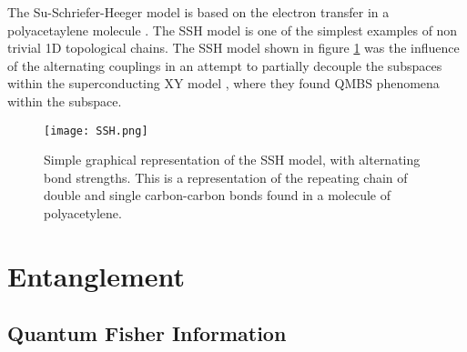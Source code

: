 The Su-Schriefer-Heeger model is based on the electron transfer in a polyacetaylene molecule \citep{su_solitons_1979}. The SSH model is one of the simplest examples of non trivial 1D topological chains. The SSH model shown in figure  \ref{fig:fig_SSH} was the influence of the alternating couplings in an attempt to partially decouple the subspaces within the superconducting XY model \citep{zhang_many-body_2022}, where they found QMBS phenomena within the subspace.

\begin{figure}
	\centering
	\texttt{[image: SSH.png]}
	\caption{Simple graphical representation of the SSH model, with alternating bond strengths. This is a representation of the repeating chain of double and single carbon-carbon bonds found in a molecule of polyacetylene.}
	\label{fig:fig_SSH}
\end{figure}

\section{Entanglement}

\subsection{Quantum Fisher Information}